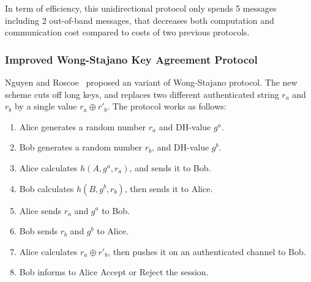 \begin{center}
\end{center}

In term of efficiency, this unidirectional protocol only spends 5 messages including 2 out-of-band messages, that decreases both computation and communication cost compared to costs of two previous protocols. 
\subsubsection*{Improved Wong-Stajano Key Agreement Protocol}

Nguyen and Roscoe~\cite{Nguyen09authenticationprotocols} proposed an variant of Wong-Stajano protocol. The new scheme cuts off long keys, and replaces two different authenticated string $r_a$ and $r_b$ by a single value $r_a\oplus r'_b$. The protocol works as follows:
\begin{enumerate}
\item Alice generates a random number $r_a$ and DH-value $g^a$.
\item Bob generates a random number $r_b$, and DH-value $g^b$.
\item Alice calculates $h(A,g^a,r_a)$, and sends it to Bob. 
\item Bob calculates $h(B,g^b,r_b)$, then sends it to Alice.
\item Alice sends $r_a$ and $g^a$ to Bob. 
\item Bob sends $r_b$ and $g^b$ to Alice. 
\item Alice calculates $r_a\oplus r'_b$, then pushes it on an authenticated channel to Bob. 
\item Bob informs to Alice Accept or Reject the session.
\end{enumerate}

